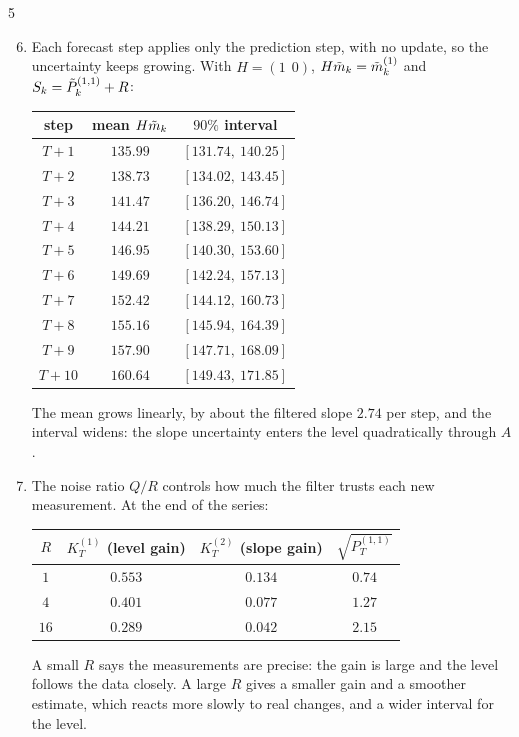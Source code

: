 \begin{homework}{5}
\begin{enumerate}[label=(\arabic*)]
\setcounter{enumi}{5}
\item Each forecast step applies only the prediction step, with no update, so the uncertainty keeps growing. With $H = (1\ \ 0)$, $H\tilde m_k = \tilde m_k^{(1)}$ and $S_k = \tilde P_k^{(1,1)} + R$:
\begin{center}
\begin{tabular}{ccc}
\toprule
step & mean $H\tilde m_k$ & $90\%$ interval\\
\midrule
$T+1$ & $135.99$ & $[131.74,\ 140.25]$\\
$T+2$ & $138.73$ & $[134.02,\ 143.45]$\\
$T+3$ & $141.47$ & $[136.20,\ 146.74]$\\
$T+4$ & $144.21$ & $[138.29,\ 150.13]$\\
$T+5$ & $146.95$ & $[140.30,\ 153.60]$\\
$T+6$ & $149.69$ & $[142.24,\ 157.13]$\\
$T+7$ & $152.42$ & $[144.12,\ 160.73]$\\
$T+8$ & $155.16$ & $[145.94,\ 164.39]$\\
$T+9$ & $157.90$ & $[147.71,\ 168.09]$\\
$T+10$ & $160.64$ & $[149.43,\ 171.85]$\\
\bottomrule
\end{tabular}
\end{center}
The mean grows linearly, by about the filtered slope $2.74$ per step, and the interval widens: the slope uncertainty enters the level quadratically through $A$.

\item The noise ratio $Q/R$ controls how much the filter trusts each new measurement. At the end of the series:
\begin{center}
\begin{tabular}{cccc}
\toprule
$R$ & $K_T^{(1)}$ (level gain) & $K_T^{(2)}$ (slope gain) & $\sqrt{P_T^{(1,1)}}$\\
\midrule
$1$ & $0.553$ & $0.134$ & $0.74$\\
$4$ & $0.401$ & $0.077$ & $1.27$\\
$16$ & $0.289$ & $0.042$ & $2.15$\\
\bottomrule
\end{tabular}
\end{center}
A small $R$ says the measurements are precise: the gain is large and the level follows the data closely. A large $R$ gives a smaller gain and a smoother estimate, which reacts more slowly to real changes, and a wider interval for the level.
\end{enumerate}
\end{homework}

